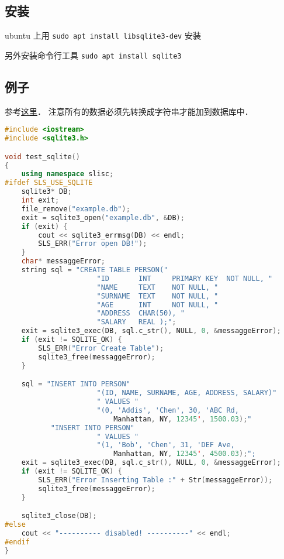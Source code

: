 
\begin{issues}
\issueDraft
\end{issues}


\subsection{安装}
ubuntu 上用 \verb|sudo apt install libsqlite3-dev| 安装

另外安装命令行工具 \verb|sudo apt install sqlite3|

\subsection{例子}
参考\href{https://www.tutorialspoint.com/sqlite/sqlite_c_cpp.htm}{这里}． 注意所有的数据必须先转换成字符串才能加到数据库中．
\begin{lstlisting}[language=cpp]
#include <iostream>
#include <sqlite3.h>

void test_sqlite()
{
	using namespace slisc;
#ifdef SLS_USE_SQLITE
	sqlite3* DB;
	int exit;
	file_remove("example.db");
	exit = sqlite3_open("example.db", &DB);
	if (exit) {
		cout << sqlite3_errmsg(DB) << endl;
		SLS_ERR("Error open DB!");
	}
	char* messaggeError;
	string sql = "CREATE TABLE PERSON("
					  "ID       INT     PRIMARY KEY  NOT NULL, "
					  "NAME     TEXT    NOT NULL, "
					  "SURNAME  TEXT    NOT NULL, "
					  "AGE      INT     NOT NULL, "
					  "ADDRESS  CHAR(50), "
					  "SALARY   REAL );";
	exit = sqlite3_exec(DB, sql.c_str(), NULL, 0, &messaggeError);
	if (exit != SQLITE_OK) {
		SLS_ERR("Error Create Table");
		sqlite3_free(messaggeError);
	}

	sql = "INSERT INTO PERSON"
					  "(ID, NAME, SURNAME, AGE, ADDRESS, SALARY)"
					  " VALUES "
					  "(0, 'Addis', 'Chen', 30, 'ABC Rd,
                          Manhattan, NY, 12345', 1500.03);"
		   "INSERT INTO PERSON"
					  " VALUES "
					  "(1, 'Bob', 'Chen', 31, 'DEF Ave,
                          Manhattan, NY, 12345', 4500.03);";
	exit = sqlite3_exec(DB, sql.c_str(), NULL, 0, &messaggeError);
	if (exit != SQLITE_OK) {
		SLS_ERR("Error Inserting Table :" + Str(messaggeError));
		sqlite3_free(messaggeError);
	}

	sqlite3_close(DB);
#else
	cout << "---------- disabled! ----------" << endl;
#endif
}
\end{lstlisting}

